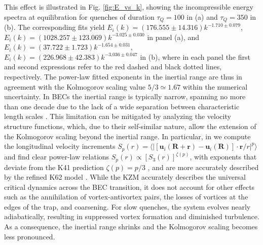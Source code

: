 \documentclass[aps,prl,twocolumn,showpacs,notitlepage,floatfix,superscriptaddress]{revtex4-1}
\begin{document}
This effect is illustrated in Fig. \ref{fig:E_vs_k}, showing the incompressible energy spectra at equilibration for quenches of duration $\tau_{Q}=100$ in (a) and $\tau_{Q}=350$ in (b). 
The corresponding fits yield $E_i \left( k \right) = \left( 176.555 \pm 14.316 \right) k^{-1.710 \pm 0.079}$, $E_i \left( k \right) = \left( 1028.257 \pm 123.069 \right) k^{-3.025 \pm 0.030}$ in panel (a), and $E_i \left( k \right) = \left( 37.722 \pm 1.723 \right) k^{-1.654 \pm 0.031}$, $E_i \left( k \right) = \left( 226.968 \pm 42.383 \right) k^{-3.036 \pm 0.047}$ in (b), 
where in each panel the first and second expressions refer to the red dashed and black dotted lines, respectively. 
The power-law fitted exponents in the inertial range 
are thus in agreement with the Kolmogorov scaling value $5/3\simeq 1.67$ within the numerical uncertainty. 
In 
BECs the inertial range is typically narrow, spanning no more than one decade due to the lack of a wide separation between characteristic length scales \cite{Kobayashi2005, Tsubota13, Barenghi2023textbook}. 
This limitation can be mitigated by analyzing the velocity structure functions, which, due to their self-similar nature, allow the extension of the Kolmogorov scaling beyond the inertial range. 
In particular, in \cite{SM} we compute the longitudinal velocity increments $S_p(r)=\langle |[\boldsymbol{u}_i(\boldsymbol{R}+\boldsymbol{r})-\boldsymbol{u}_i(\boldsymbol{R})]\cdot
\boldsymbol{r} / r 
|^p \rangle$ and find clear power-law relations $S_p(r)\propto [S_3(r)]^{\zeta(p)}$, with exponents that deviate from the K41 prediction $\zeta(p)=p/3$ 
\cite{Kolmogorov41_first,Kolmogorov41,Benzi1993,Dubrulle1994,Ciliberto1994,Frisch1995,Krstulovic2016,Barenghi2023textbook,Zhao25}, and are more accurately described by the refined K62 model \cite{Kolmogorov_1962}.
While the KZM accurately describes the universal critical dynamics across the BEC transition, it does not account for other effects such as the annihilation of vortex-antivortex pairs, the losses of vortices at the edges of the trap, and coarsening. 
For slow quenches, the system evolves nearly adiabatically, resulting in suppressed vortex formation and diminished turbulence. As a consequence, the inertial range shrinks and the Kolmogorov scaling becomes less pronounced.
\end{document}
